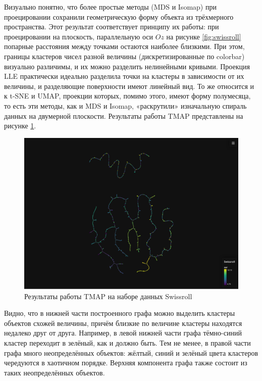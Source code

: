 \documentclass[10pt, a4paper]{extarticle}
\begin{document}
Визуально понятно, что более простые методы (MDS и Isomap) при проецировании сохранили геометрическую форму объекта из трёхмерного пространства. Этот результат соответствует принципу их работы: при проецировании на плоскость, параллельную оси $Oz$ на рисунке \ref{fig:swissroll} попарные расстояния между точками остаются наиболее близкими. При этом, границы кластеров чисел разной величины (дискретизированные по colorbar) визуально различимы, и их можно разделить нелинейными кривыми. Проекция LLE практически идеально разделила точки на кластеры в зависимости от их величины, и разделяющие поверхности имеют линейный вид. То же относится и к t-SNE и UMAP, проекции которых, помимо этого, имеют форму полумесяца, то есть эти методы, как и MDS и Isomap, «раскрутили» изначальную спираль данных на двумерной плоскости. Результаты работы TMAP представлены на рисунке \ref{fig:results_swissroll_tmap}. 
\begin{figure}[h!]
    \centering
    \includegraphics[width=\linewidth]{swissroll_tmap.pdf}
    \caption{Результаты работы TMAP на наборе данных Swissroll}
    \label{fig:results_swissroll_tmap}
\end{figure}

Видно, что в нижней части построенного графа можно выделить кластеры объектов схожей величины, причём близкие по величине кластеры находятся недалеко друг от друга. Например, в левой нижней части графа тёмно-синий кластер переходит в зелёный, как и должно быть. Тем не менее, в правой части графа много неопределённых объектов: жёлтый, синий и зелёный цвета кластеров чередуются в хаотичном порядке. Верхняя компонента графа также состоит из таких неопределённых объектов.
\end{document}
